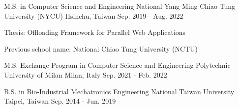 

\begin{cventries}

  
\cventry
  {M.S. in Computer Science and Engineering} %
  {National Yang Ming Chiao Tung University (NYCU)} %
  {Hsinchu, Taiwan} %
  {Sep. 2019 - Aug. 2022} %
  {
    \begin{cvitems} %
      \item {Thesis: Offloading Framework for Parallel Web Applications}
      \item {Previous school name: National Chiao Tung University (NCTU)}
    \end{cvitems}
  }

\cventry
    {M.S. Exchange Program in Computer Science and Engineering} %
    {Polytechnic University of Milan} %
    {Milan, Italy} %
    {Sep. 2021 - Feb. 2022} %
    {
      \begin{cvitems} %
      \end{cvitems}
    }

  \cventry
    {B.S. in Bio-Industrial Mechatronics Engineering} %
    {National Taiwan University} %
    {Taipei, Taiwan} %
    {Sep. 2014 - Jun. 2019} %
    {
      \begin{cvitems} %
      \end{cvitems}
    }

\end{cventries}
